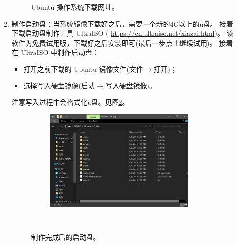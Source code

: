 \begin{itemize}
\begin{enumerate}
\begin{figure}[htbp]
					\caption{Ubuntu 操作系统下载网址。}
					\label{fig:ubuntuDown}
				\end{figure}
			\item 制作启动盘：当系统镜像下载好之后，需要一个新的4G以上的u盘。
				接着下载启动盘制作工具 UltraISO ( \url{https://cn.ultraiso.net/xiazai.html})。
				该软件为免费试用版，下载好之后安装即可(最后一步点击继续试用)。
				接着在 UltraISO 中制作启动盘：
				\begin{itemize}
					\item 打开之前下载的 Ubuntu 镜像文件(文件$\to$打开)；
					\item 选择写入硬盘镜像(启动$\to$写入硬盘镜像)。
				\end{itemize}
				注意写入过程中会格式化u盘。见图\ref{fig:UltraISO}。
			　	\begin{figure}[htbp]
			　		\centering
			　		\includegraphics[width=0.75\textwidth]{png/UltraISO}
			　		\caption{制作完成后的启动盘。}
			　		\label{fig:UltraISO}
			　	\end{figure}
		\end{enumerate}


\end{itemize}
